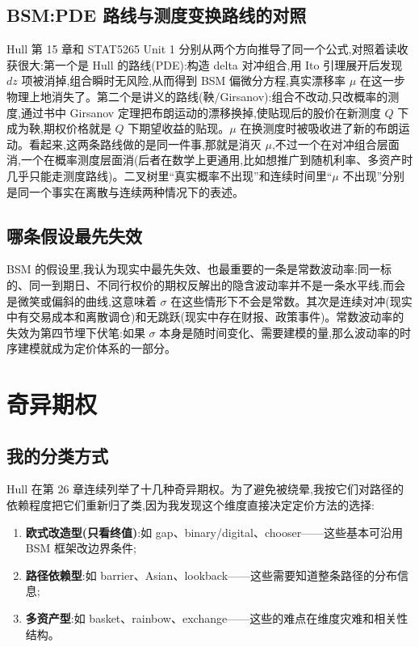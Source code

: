 \documentclass[11pt]{ctexart}
\begin{document}
\subsection{BSM:PDE 路线与测度变换路线的对照}
Hull 第 15 章和 STAT5265 Unit 1 分别从两个方向推导了同一个公式,对照着读收获很大:第一个是 Hull 的路线(PDE):构造 delta 对冲组合,用 Ito 引理展开后发现 $dz$ 项被消掉,组合瞬时无风险,从而得到 BSM 偏微分方程,真实漂移率 $\mu$ 在这一步物理上地消失了。第二个是讲义的路线(鞅/Girsanov):组合不改动,只改概率的测度,通过书中 Girsanov 定理把布朗运动的漂移换掉,使贴现后的股价在新测度 $Q$ 下成为鞅,期权价格就是 $Q$ 下期望收益的贴现。$\mu$ 在换测度时被吸收进了新的布朗运动。看起来,这两条路线做的是同一件事,那就是消灭 $\mu$,不过一个在对冲组合层面消,一个在概率测度层面消(后者在数学上更通用,比如想推广到随机利率、多资产时几乎只能走测度路线)。二叉树里``真实概率不出现''和连续时间里``$\mu$ 不出现''分别是同一个事实在离散与连续两种情况下的表述。

\subsection{哪条假设最先失效}
BSM 的假设里,我认为现实中最先失效、也最重要的一条是常数波动率:同一标的、同一到期日、不同行权价的期权反解出的隐含波动率并不是一条水平线,而会是微笑或偏斜的曲线,这意味着 $\sigma$ 在这些情形下不会是常数。其次是连续对冲(现实中有交易成本和离散调仓)和无跳跃(现实中存在财报、政策事件)。常数波动率的失效为第四节埋下伏笔:如果 $\sigma$ 本身是随时间变化、需要建模的量,那么波动率的时序建模就成为定价体系的一部分。

\section{奇异期权}

\subsection{我的分类方式}
Hull 在第 26 章连续列举了十几种奇异期权。为了避免被绕晕,我按它们对路径的依赖程度把它们重新归了类,因为我发现这个维度直接决定定价方法的选择:
\begin{enumerate}
  \item \textbf{欧式改造型(只看终值)}:如 gap、binary/digital、chooser——这些基本可沿用 BSM 框架改边界条件;
  \item \textbf{路径依赖型}:如 barrier、Asian、lookback——这些需要知道整条路径的分布信息;
  \item \textbf{多资产型}:如 basket、rainbow、exchange——这些的难点在维度灾难和相关性结构。
\end{enumerate}
\end{document}
